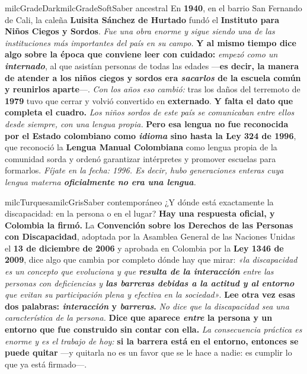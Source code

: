 \documentclass[11pt,letterpaper]{article}
\begin{document}
\begin{softbox}{milcGradeDark}{milcGradeSoft}{Saber ancestral}
En \textbf{1940}, en el barrio San Fernando de Cali, la caleña \textbf{Luisita Sánchez de Hurtado} fundó el \textbf{Instituto para Niños Ciegos y Sordos}. \emph{Fue una obra enorme y sigue siendo una de las instituciones más importantes del país en su campo.} \textbf{Y al mismo tiempo dice algo sobre la época que conviene leer con cuidado:} \emph{empezó como un \textbf{internado}}, al que asistían personas de todas las edades ---\textbf{es decir, la manera de atender a los niños ciegos y sordos era \emph{sacarlos} de la escuela común y reunirlos aparte}---. \emph{Con los años eso cambió:} tras los daños del terremoto de \textbf{1979} tuvo que cerrar y volvió convertido en \textbf{externado}. \textbf{Y falta el dato que completa el cuadro.} \emph{Los niños sordos de este país se comunicaban entre ellos desde siempre, con una lengua propia.} \textbf{Pero esa lengua no fue reconocida por el Estado colombiano como \emph{idioma} sino hasta la \textbf{Ley 324 de 1996}}, que reconoció la \textbf{Lengua Manual Colombiana} como lengua propia de la comunidad sorda y ordenó garantizar intérpretes y promover escuelas para formarlos. \emph{Fíjate en la fecha: 1996. Es decir, hubo generaciones enteras cuya lengua materna \textbf{oficialmente no era una lengua}.}
\end{softbox}

\begin{softbox}{milcTurquesa}{milcGris}{Saber contemporáneo}
¿Y dónde está exactamente la discapacidad: en la persona o en el lugar? \textbf{Hay una respuesta oficial, y Colombia la firmó.} La \textbf{Convención sobre los Derechos de las Personas con Discapacidad}, adoptada por la Asamblea General de las Naciones Unidas el \textbf{13 de diciembre de 2006} y aprobada en Colombia por la \textbf{Ley 1346 de 2009}, dice algo que cambia por completo dónde hay que mirar: \emph{«la discapacidad es un concepto que evoluciona y que \textbf{resulta de la interacción} entre las personas con deficiencias y \textbf{las barreras debidas a la actitud y al entorno} que evitan su participación plena y efectiva en la sociedad»}. \textbf{Lee otra vez esas dos palabras: \emph{interacción} y \emph{barreras}.} \emph{No dice que la discapacidad sea una característica de la persona.} \textbf{Dice que aparece \emph{entre} la persona y un entorno que fue construido sin contar con ella.} \emph{La consecuencia práctica es enorme y es el trabajo de hoy:} \textbf{si la barrera está en el entorno, entonces se puede quitar} ---y quitarla no es un favor que se le hace a nadie: es cumplir lo que ya está firmado---.
\end{softbox}
\end{document}
